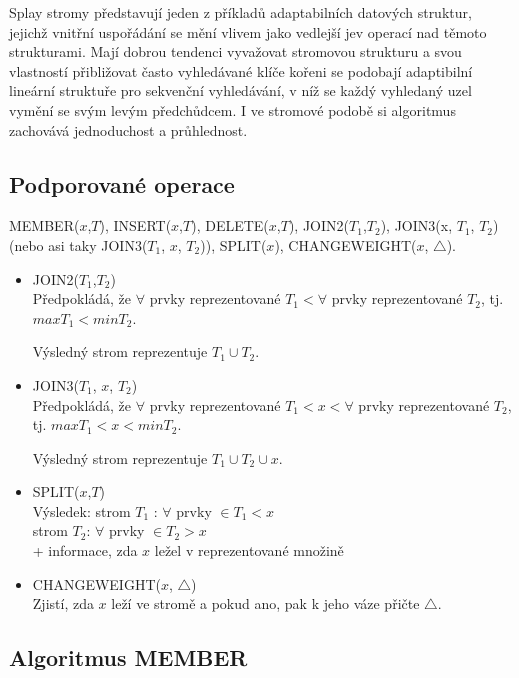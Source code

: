 Splay stromy představují jeden z příkladů adaptabilních datových 
struktur, jejichž vnitřní uspořádání se mění vlivem jako vedlejší jev 
operací nad těmoto strukturami. Mají dobrou tendenci vyvažovat stromovou 
strukturu a svou vlastností přibližovat často vyhledávané klíče kořeni 
se podobají adaptibilní lineární struktuře pro sekvenční vyhledávání, v 
níž se každý vyhledaný uzel vymění se svým levým předchůdcem. I ve 
stromové podobě si algoritmus zachovává jednoduchost a průhlednost. 


\subsection{Podporované operace}

MEMBER($x$,$T$), INSERT($x$,$T$), DELETE($x$,$T$), 
JOIN2($T_1$,$T_2$), JOIN3(x, $T_1$, $T_2$) 
(nebo asi taky JOIN3($T_1$, $x$, $T_2$)), SPLIT($x$), 
CHANGEWEIGHT($x$, $\triangle$).

\begin{itemize}
\item JOIN2($T_1$,$T_2$) \\
Předpokládá, že $\forall$ prvky reprezentované $T_1 < \forall$ prvky
reprezentované $T_2$, tj. $max T_1 < min T_2$.

Výsledný strom reprezentuje $T_1 \cup T_2$.

\item JOIN3($T_1$, $x$, $T_2$) \\
Předpokládá, že $\forall$ prvky reprezentované $T_1 < x < \forall$ prvky 
reprezentované $T_2$, tj. $max T_1 < x < min T_2$.

Výsledný strom reprezentuje $T_1 \cup T_2 \cup x$.


\item SPLIT($x$,$T$) \\
Výsledek: strom $T_1$ : $\forall$ prvky $\in T_1 < x$\\
	strom $T_2$: $\forall$ prvky $\in T_2 > x$\\
+ informace, zda $x$ ležel v reprezentované množině

\item CHANGEWEIGHT($x$, $\triangle$) \\
Zjistí, zda $x$ leží ve stromě a pokud ano, pak k jeho váze přičte
$\triangle$.
\end{itemize}


\subsection{Algoritmus MEMBER}

